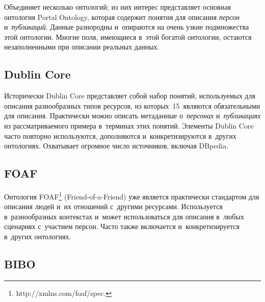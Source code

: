 \begin{multicols}{2}
    Объединяет несколько онтологий; из них интерес представляет 
основная онтология Portal Ontology, которая содержит понятия для 
описания \textit{персон} и~\textit{пуб\-ли\-ка\-ций}. Данные разнородны 
и~опираются на очень узкие подмножества этой онтологии. Многие поля, 
имеющиеся в~этой богатой онтологии, остаются незаполненными при 
описании реальных данных.

\vspace*{-4pt}
     
     \subsection*{Dublin Core}
     
\vspace*{-2pt}
     
    Исторически Dublin Core представляет собой набор понятий, 
используемых для описания разнообразных типов ресурсов, из 
которых~15~являются обязательными для описания. Практически можно 
описать метаданные о~\textit{персонах} и~\textit{пуб\-ли\-ка\-ци\-ях} из 
рассматриваемого примера в~терминах этих понятий. Элементы Dublin Core часто 
повторно используются, дополняются и~конкретизируются в~других 
онтологиях. Охватывает огромное число источников, включая DBpedia.

\vspace*{-4pt}
    
     \subsection*{FOAF}
     
\vspace*{-2pt}
     
    Онтология FOAF\footnote[4]{{\sf http://xmlns.com/foaf/spec.}}
    (Friend-of-a-Friend)  уже является 
практически стандартом для описания людей и~их отношений с~другими 
ресурсами. Используется в~разнообразных контекстах и~может 
использоваться для описания в~любых сценариях с~участием персон. Часто 
также включается и~конкретизируется в~других онтологиях.

    
     \subsection*{BIBO}
     
     
     

\end{multicols}
